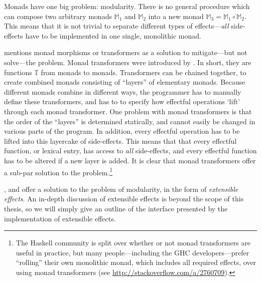 Monads have one big problem: modularity. There is no general procedure
which can compose two arbitrary monads $\mathbb{M}_1$ and
$\mathbb{M}_2$ into a new monad $\mathbb{M}_3 = \mathbb{M}_1 \circ
\mathbb{M}_2$. This means that it is not trivial to separate different
types of effects---\emph{all} side-effects have to be implemented in
one single, monolithic monad.

\citet{shan2002} mentions monad morphisms or transformers as a
solution to mitigate---but not solve---the problem.
Monad transformers were introduced by \citet{liang1995}. In short,
they are functions $\mathbb{T}$ from monads to monads. Transformers
can be chained together, to create combined monads consisting of
``layers'' of elementary monads. Because different monads combine in
different ways, the programmer has to manually define these
transformers, and has to to specify how effectful operations `lift'
through each monad transformer.
One problem with monad transformers is that the order of the
``layers'' is determined statically, and cannot easily be changed in
various parts of the program. In addition, every effectful operation
has to be lifted into this layercake of side-effects. This means that
that every effectful function, or lexical entry, has access to
\emph{all} side-effects, and every effectful function has to be
altered if a new layer is added. It is clear that monad transformers
offer a sub-par solution to the problem.\footnote{%
  The Haskell community is split over whether or not monad
  transformers are useful in practice, but many people---including the
  GHC developers---prefer ``rolling'' their own monolithic monad,
  which includes all required effects, over using monad transformers
  (see \url{http://stackoverflow.com/a/2760709}).
}

\citet{cartwright1994}, \citet{kiselyov2013} and \citet{kiselyov2015}
offer a solution to the problem of modularity, in the form of
\emph{extensible effects}. An in-depth discussion of extensible
effects is beyond the scope of this thesis, so we will simply give an
outline of the interface presented by the \citeyear{kiselyov2015}
implementation of extensible effects.

